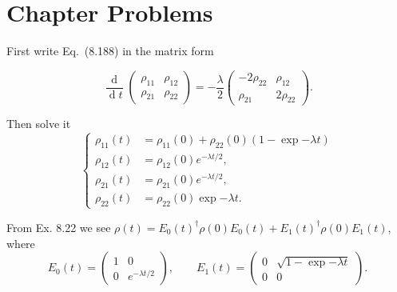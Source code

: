 \section*{Chapter Problems}

\prob First write Eq.~(8.188) in the matrix form

$$\frac{\operatorname{d}}{\operatorname{d}t}\begin{pmatrix}
    \rho_{11} & \rho_{12} \\
    \rho_{21} & \rho_{22}
\end{pmatrix} = -\frac{\lambda}{2}\begin{pmatrix}
    -2\rho_{22} & \rho_{12} \\
    \rho_{21} & 2\rho_{22}
\end{pmatrix}.$$

Then solve it
$$\begin{cases}
    \rho_{11}(t) & = \rho_{11}(0) + \rho_{22}(0)(1-\exp{-\lambda t}) \\
    \rho_{12}(t) & = \rho_{12}(0)e^{-\lambda t/2}, \\
    \rho_{21}(t) & = \rho_{21}(0)e^{-\lambda t/2}, \\
    \rho_{22}(t) & = \rho_{22}(0)\exp{-\lambda t}.
\end{cases}$$

From Ex. 8.22 we see $\rho(t)=E_0(t)^\dagger\rho(0)E_0(t)+E_1(t)^\dagger\rho(0)E_1(t)$, where
$$
    E_0(t) = \begin{pmatrix}
        1 & 0 \\
        0 & e^{-\lambda t/2}
    \end{pmatrix}, \qquad
    E_1(t) = \begin{pmatrix}
        0 & \sqrt{1-\exp{-\lambda t}} \\
        0 & 0
    \end{pmatrix}.
$$

\prob

\prob